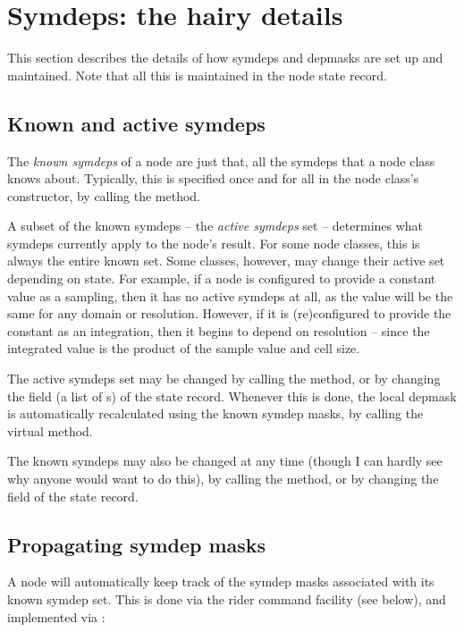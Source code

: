 \section{Symdeps: the hairy details}

  This section describes the details of how symdeps and depmasks are set up and
  maintained. Note that all this is maintained in the node state record.

\subsection{Known and active symdeps} 
  
  The {\em known symdeps} of a node are just that, all the symdeps that a node
  class knows about. Typically, this is specified once and for all in the
  node class's constructor, by calling the  method.
  
  A subset of the known symdeps -- the {\em active symdeps} set -- determines
  what symdeps currently apply to the node's result. For some node classes,
  this is always the entire known set. Some classes, however, may change their
  active set depending on state. For example, if a  node is
  configured to provide a constant value as a sampling, then it has no active
  symdeps at all, as the value will be the same for any domain or resolution.
  However, if it is (re)configured to provide the constant as an integration,
  then it begins to depend on resolution -- since the integrated value is the
  product of the sample value and cell size.

  The active symdeps set may be changed by calling the 
  method, or by changing the  field (a list of s)
  of the state record. Whenever this is done, the local depmask is
  automatically recalculated using the known symdep masks, by calling the
  virtual  method.

  The known symdeps may also be changed at any time (though I can hardly see
  why anyone would want to do this), by calling the 
  method, or by changing the   field of the state record. 
  
\subsection{Propagating symdep masks}

  A node will automatically keep track of the symdep masks associated with its
  known symdep set. This is done via the rider command facility (see below),
  and implemented via :

